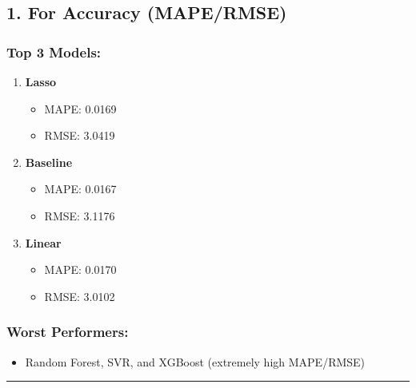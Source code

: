 \documentclass[
]{article}
\providecommand{\tightlist}{%
  \setlength{\itemsep}{0pt}\setlength{\parskip}{0pt}}
\begin{document}
\subsection{1. For Accuracy (MAPE/RMSE)}\label{for-accuracy-mapermse}

\subsubsection{Top 3 Models:}\label{top-3-models}

\begin{enumerate}
\def\labelenumi{\arabic{enumi}.}
\tightlist
\item
  \textbf{Lasso}

  \begin{itemize}
  \tightlist
  \item
    MAPE: 0.0169\\
  \item
    RMSE: 3.0419\\
  \end{itemize}
\item
  \textbf{Baseline}

  \begin{itemize}
  \tightlist
  \item
    MAPE: 0.0167\\
  \item
    RMSE: 3.1176\\
  \end{itemize}
\item
  \textbf{Linear}

  \begin{itemize}
  \tightlist
  \item
    MAPE: 0.0170\\
  \item
    RMSE: 3.0102
  \end{itemize}
\end{enumerate}

\subsubsection{Worst Performers:}\label{worst-performers}

\begin{itemize}
\tightlist
\item
  Random Forest, SVR, and XGBoost (extremely high MAPE/RMSE)
\end{itemize}

\begin{center}\rule{0.5\linewidth}{0.5pt}\end{center}
\end{document}
